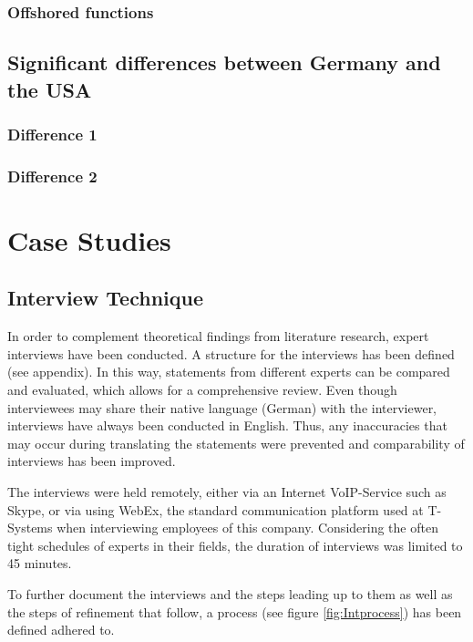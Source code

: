 \documentclass[  12pt,
titlepage,
parskip,
draft=false,
headsepline=true,
footsepline=true,
captions=tableheading]{scrartcl}
\begin{document}
\subsubsection{Offshored functions}

\subsection{Significant differences between Germany and the USA}

\subsubsection{Difference 1}

\subsubsection{Difference 2}

\newpage
\section{Case Studies}

\subsection{Interview Technique}
In order to complement theoretical findings from literature research, expert interviews have been conducted. A structure for the interviews has been defined (see appendix). In this way, statements from different experts can be compared and evaluated, which allows for a comprehensive review. Even though interviewees may share their native language (German) with the interviewer, interviews have always been conducted in English. Thus, any inaccuracies that may occur during translating the statements were prevented and comparability of interviews has been improved.

The interviews were held remotely, either via an Internet VoIP-Service such as Skype, or via using WebEx, the standard communication platform used at T-Systems when interviewing employees of this company. Considering the often tight schedules of experts in their fields, the duration of interviews was limited to 45 minutes.

To further document the interviews and the steps leading up to them as well as the steps of refinement that follow, a process (see figure \ref{fig:Intprocess}) has been defined adhered to. 
\end{document}
